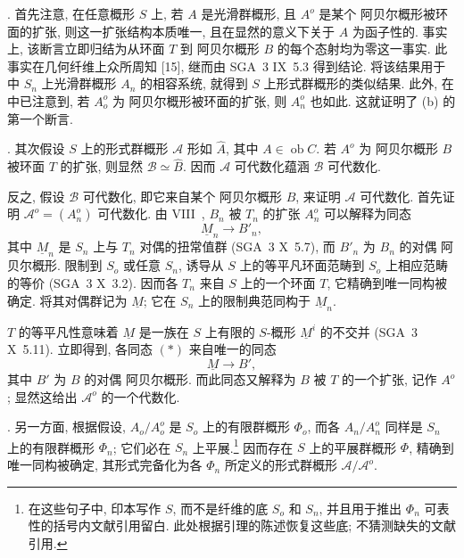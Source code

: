 \medskip
\noindent
{}. 首先注意, 在任意概形 $S$ 上, 若 $A$ 是光滑群概形, 且 $A^o$ 是某个 阿贝尔概形被环面的扩张, 则这一扩张结构本质唯一, 且在显然的意义下关于 $A$ 为函子性的. 事实上, 该断言立即归结为从环面 $T$ 到 阿贝尔概形 $B$ 的每个态射均为零这一事实. 此事实在几何纤维上众所周知 [15], 继而由 SGA~3 IX~5.3 得到结论. 将该结果用于  中 $S_n$ 上光滑群概形 $A_n$ 的相容系统, 就得到 $S$ 上形式群概形的类似结果. 此外, 在  中已注意到, 若 $A_o^o$ 为 阿贝尔概形被环面的扩张, 则 $A_n^o$ 也如此. 这就证明了 (b) 的第一个断言.

\medskip
\noindent
{}. 其次假设 $S$ 上的形式群概形 $\mathcal A$ 形如 $\widehat A$, 其中 $A\in\operatorname{ob}C$. 若 $A^o$ 为 阿贝尔概形 $B$ 被环面 $T$ 的扩张, 则显然 $\mathcal B\simeq\widehat B$. 因而 $\mathcal A$ 可代数化蕴涵 $\mathcal B$ 可代数化.

反之, 假设 $\mathcal B$ 可代数化, 即它来自某个 阿贝尔概形 $B$, 来证明 $\mathcal A$ 可代数化. 首先证明 $\mathcal A^o=(A_n^o)$ 可代数化. 由 VIII~, $B_n$ 被 $T_n$ 的扩张 $A_n^o$ 可以解释为同态
\begin{equation}\tag{*}
 \underline M_n\longrightarrow B'_n,
\end{equation}
其中 $\underline M_n$ 是 $S_n$ 上与 $T_n$ 对偶的扭常值群 (SGA~3 X~5.7), 而 $B'_n$ 为 $B_n$ 的对偶 阿贝尔概形. 限制到 $S_o$ 或任意 $S_n$, 诱导从 $S$ 上的等平凡环面范畴到 $S_o$ 上相应范畴的等价 (SGA~3 X~3.2). 因而各 $T_n$ 来自 $S$ 上的一个环面 $T$, 它精确到唯一同构被确定. 将其对偶群记为 $\underline M$; 它在 $S_n$ 上的限制典范同构于 $\underline M_n$.

$T$ 的等平凡性意味着 $\underline M$ 是一族在 $S$ 上有限的 $S$-概形 $\underline M^i$ 的不交并 (SGA~3 X~5.11). 立即得到, 各同态 $(*)$ 来自唯一的同态
\begin{equation}\tag{**}
 \underline M\longrightarrow B',
\end{equation}
其中 $B'$ 为 $B$ 的对偶 阿贝尔概形. 而此同态又解释为 $B$ 被 $T$ 的一个扩张, 记作 $A^o$; 显然这给出 $\mathcal A^o$ 的一个代数化.

\medskip
\noindent
{}. 另一方面, 根据假设, $A_o/A_o^o$ 是 $S_o$ 上的有限群概形 $\Phi_o$, 而各 $A_n/A_n^o$ 同样是 $S_n$ 上的有限群概形 $\Phi_n$; 它们必在 $S_n$ 上平展.\footnote{在这些句子中, 印本写作 $S$, 而不是纤维的底 $S_o$ 和 $S_n$, 并且用于推出 $\Phi_n$ 可表性的括号内文献引用留白. 此处根据引理的陈述恢复这些底; 不猜测缺失的文献引用.} 因而存在 $S$ 上的平展群概形 $\Phi$, 精确到唯一同构被确定, 其形式完备化为各 $\Phi_n$ 所定义的形式群概形 $\mathcal A/\mathcal A^o$.

